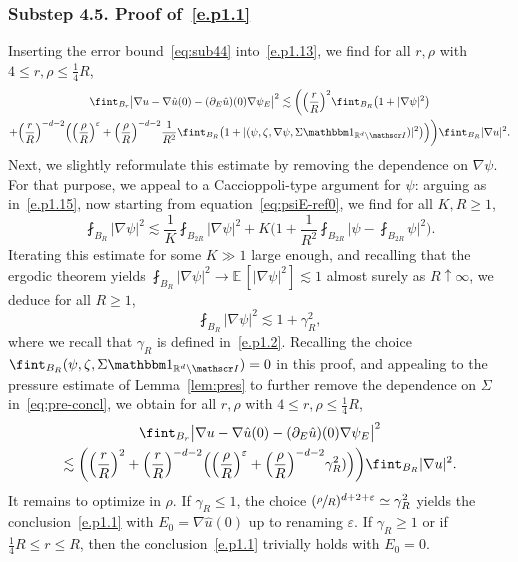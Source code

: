 \documentclass[10pt]{amsart}
\let\mathcal\mathscr
\let\mathds\mathbbm
\theoremstyle{plain}
\theoremstyle{definition}
\newcommand{\e}{\varepsilon}
\newcommand{\R}{\mathbb R}
\newcommand{\Ic}{\mathcal I}
\newcommand{\substep}[1]{\subsubsection*{Substep #1}}
\newcommand{\expecmm}[1]{\mathbb{E}\,[ #1 ]}
\begin{document}
\substep{4.5. Proof of~\eqref{e.p1.1}}
Inserting the error bound~\eqref{eq:sub44} into~\eqref{e.p1.13}, we find for all $r,\rho$ with $4\le r,\rho\le\frac14R$,
\begin{multline}\label{eq:pre-concl}
\fint_{B_r} \big|\nabla u-\nabla\hat u(0)-(\partial_E \hat u)(0)\nabla \psi_E\big|^2
\lesssim \bigg(\Bigl(\frac{r}{R}\Bigr)^2\fint_{B_R}\big(1+|\nabla\psi|^2\big)\\
+\Bigl(\frac{r}{R}\Bigr)^{-d-2}\Big(\Bigl(\frac{\rho}{R}\Bigr)^\e+\Bigl(\frac{\rho}{R}\Bigr)^{-d-2}\frac1{R^2}\fint_{B_R}\big(1+|(\psi,\zeta,\nabla\psi,\Sigma\mathds1_{\R^d\setminus\Ic})|^2\big)\Big)\bigg)\fint_{B_R}|\nabla u|^2.
\end{multline}
Next, we slightly reformulate this estimate by removing the dependence on $\nabla\psi$.
For that purpose, we appeal to a Caccioppoli-type argument for $\psi$: arguing as in~\eqref{e.p1.15}, now starting from equation~\eqref{eq:psiE-ref0}, we find for all $K,R\ge1$,
\begin{equation*}
\fint_{B_{R}}|\nabla\psi|^2\lesssim \frac1K\fint_{B_{2R}}|\nabla\psi|^2+K\bigg(1+\frac{1}{R^2}\fint_{B_{2R}}\Big|\psi-\fint_{B_{2R}}\psi\Big|^2\bigg).
\end{equation*}
Iterating this estimate for some $K\gg1$ large enough, and recalling that the ergodic theorem yields $\fint_{B_R}|\nabla\psi|^2\to\expecmm{|\nabla\psi|^2}\lesssim1$ almost surely as $R\uparrow\infty$, we deduce for all $R\ge1$,
\begin{equation}\label{eq:bnditer-psiE}
\fint_{B_{R}}|\nabla\psi|^2
\lesssim 1+\gamma_{R}^2,
\end{equation}
where we recall that $\gamma_R$ is defined in~\eqref{e.p1.2}.
Recalling the choice $\fint_{B_R}(\psi,\zeta,\Sigma\mathds1_{\R^d\setminus\Ic})=0$ in this proof, and appealing to the pressure estimate of Lemma~\ref{lem:pres} to further remove the dependence on $\Sigma$ in~\eqref{eq:pre-concl}, we obtain for all $r,\rho$ with $4\le r,\rho\le\frac14R$,
\begin{multline*}
\fint_{B_r} \big|\nabla u-\nabla\hat u(0)-(\partial_E \hat u)(0)\nabla \psi_E\big|^2\\
\lesssim \bigg(\Bigl(\frac{r}{R}\Bigr)^2
+\Bigl(\frac{r}{R}\Bigr)^{-d-2}\Big(\Bigl(\frac{\rho}{R}\Bigr)^\e+\Bigl(\frac{\rho}{R}\Bigr)^{-d-2}\gamma_{R}^2)\Big)\bigg)\fint_{B_R}|\nabla u|^2.
\end{multline*}
It remains to optimize in $\rho$.
If $\gamma_{R}\le1$, the choice $(\sfrac\rho R)^{d+2+\e}\simeq\gamma_R^2$ yields the conclusion~\eqref{e.p1.1} with $E_0=\nabla\hat u(0)$ up to renaming $\e$. If $\gamma_R\ge1$ or if $\frac14R\le r\le R$, then the conclusion~\eqref{e.p1.1} trivially holds with $E_0=0$.
\end{document}
